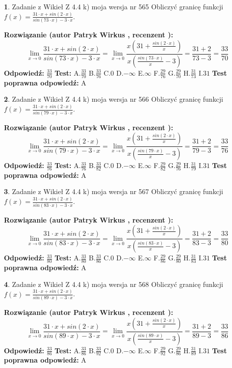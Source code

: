 \documentclass[12pt, a4paper]{article}
\theoremstyle{definition} %
\newtheorem{zad}{}
\newcommand{\zadStart}[1]{\begin{zad}#1\newline}
\newcommand{\zadStop}{\end{zad}}
\newcommand{\rozwStart}[2]{\noindent \textbf{Rozwiązanie (autor #1 , recenzent #2): }\newline}
\newcommand{\rozwStop}{\newline}
\newcommand{\odpStart}{\noindent \textbf{Odpowiedź:}\newline}
\newcommand{\odpStop}{\newline}
\newcommand{\testStart}{\noindent \textbf{Test:}\newline}
\newcommand{\testStop}{\newline}
\newcommand{\kluczStart}{\noindent \textbf{Test poprawna odpowiedź:}\newline}
\newcommand{\kluczStop}{\newline}
\begin{document}
\zadStart{Zadanie z Wikieł Z 4.4 k) moja wersja nr 565}
Obliczyć granicę funkcji $f(x)=\frac{31\cdot x +sin(2\cdot x)}{sin(73\cdot x) -3\cdot x}$.
\zadStop
\rozwStart{Patryk Wirkus}{}
$$\lim\limits_{x\to 0}\frac{31\cdot x +sin(2\cdot x)}{sin(73\cdot x) -3\cdot x}
=\lim\limits_{x\to 0}\frac{x(31+\frac{sin(2\cdot x)}{x})}{x(\frac{sin(73\cdot x)}{x}-3)}
=\frac{31+2}{73-3} = \frac{33}{70}$$
\rozwStop
\odpStart
$\frac{33}{70}$
\odpStop
\testStart
A.$\frac{33}{70}$
B.$\frac{33}{76}$
C.$0$
D.$-\infty$
E.$\infty$
F.$\frac{29}{76}$
G.$\frac{29}{70}$
H.$\frac{31}{73}$
I.$31$
\testStop
\kluczStart
A
\kluczStop



\zadStart{Zadanie z Wikieł Z 4.4 k) moja wersja nr 566}
Obliczyć granicę funkcji $f(x)=\frac{31\cdot x +sin(2\cdot x)}{sin(79\cdot x) -3\cdot x}$.
\zadStop
\rozwStart{Patryk Wirkus}{}
$$\lim\limits_{x\to 0}\frac{31\cdot x +sin(2\cdot x)}{sin(79\cdot x) -3\cdot x}
=\lim\limits_{x\to 0}\frac{x(31+\frac{sin(2\cdot x)}{x})}{x(\frac{sin(79\cdot x)}{x}-3)}
=\frac{31+2}{79-3} = \frac{33}{76}$$
\rozwStop
\odpStart
$\frac{33}{76}$
\odpStop
\testStart
A.$\frac{33}{76}$
B.$\frac{33}{82}$
C.$0$
D.$-\infty$
E.$\infty$
F.$\frac{29}{82}$
G.$\frac{29}{76}$
H.$\frac{31}{79}$
I.$31$
\testStop
\kluczStart
A
\kluczStop



\zadStart{Zadanie z Wikieł Z 4.4 k) moja wersja nr 567}
Obliczyć granicę funkcji $f(x)=\frac{31\cdot x +sin(2\cdot x)}{sin(83\cdot x) -3\cdot x}$.
\zadStop
\rozwStart{Patryk Wirkus}{}
$$\lim\limits_{x\to 0}\frac{31\cdot x +sin(2\cdot x)}{sin(83\cdot x) -3\cdot x}
=\lim\limits_{x\to 0}\frac{x(31+\frac{sin(2\cdot x)}{x})}{x(\frac{sin(83\cdot x)}{x}-3)}
=\frac{31+2}{83-3} = \frac{33}{80}$$
\rozwStop
\odpStart
$\frac{33}{80}$
\odpStop
\testStart
A.$\frac{33}{80}$
B.$\frac{33}{86}$
C.$0$
D.$-\infty$
E.$\infty$
F.$\frac{29}{86}$
G.$\frac{29}{80}$
H.$\frac{31}{83}$
I.$31$
\testStop
\kluczStart
A
\kluczStop



\zadStart{Zadanie z Wikieł Z 4.4 k) moja wersja nr 568}
Obliczyć granicę funkcji $f(x)=\frac{31\cdot x +sin(2\cdot x)}{sin(89\cdot x) -3\cdot x}$.
\zadStop
\rozwStart{Patryk Wirkus}{}
$$\lim\limits_{x\to 0}\frac{31\cdot x +sin(2\cdot x)}{sin(89\cdot x) -3\cdot x}
=\lim\limits_{x\to 0}\frac{x(31+\frac{sin(2\cdot x)}{x})}{x(\frac{sin(89\cdot x)}{x}-3)}
=\frac{31+2}{89-3} = \frac{33}{86}$$
\rozwStop
\odpStart
$\frac{33}{86}$
\odpStop
\testStart
A.$\frac{33}{86}$
B.$\frac{33}{92}$
C.$0$
D.$-\infty$
E.$\infty$
F.$\frac{29}{92}$
G.$\frac{29}{86}$
H.$\frac{31}{89}$
I.$31$
\testStop
\kluczStart
A
\kluczStop
\end{document}
